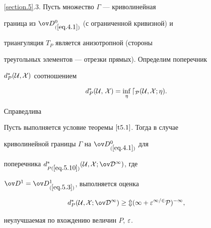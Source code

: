 \ref{section.5}.3. Пусть множество $\varGamma$ --- криволинейная


граница из $\od{}^0_{(\ref{eq.4.1})}$ (с ограниченной кривизной) и


триангуляция $T_P$ является анизотропной (стороны


треугольных элементов --- отрезки прямых). Определим поперечник


$d_P^*(\cal{U},X)$ соотношением


\begin{equation}


\label{eq.5.10}


d_P^*(\cu,\,X)=\inf_{\eta}d_P(\cu,X;\eta).


\end{equation}





Справедлива





\begin{thms} \label{t5.2}


Пусть выполняется условие теоремы $\ref{t5.1}$. Тогда в случае


криволинейной границы $\varGamma$ на $\od{}^0_{(\ref{eq.4.1})}$ для


поперечника $d_{P(\ref{eq.5.10})}^*(\cu,X;\od{}^1)$, где


$\od{}^1=\od{}^1_{(\ref{eq.5.3})}$, выполняется оценка


$$


d_P^*(\cu,X; \od{}^1)\geq m(1+\eps^{1/2} P)^{-1},


$$


неулучшаемая по вхождению величин $P$, $\varepsilon$.


\end{thms}





